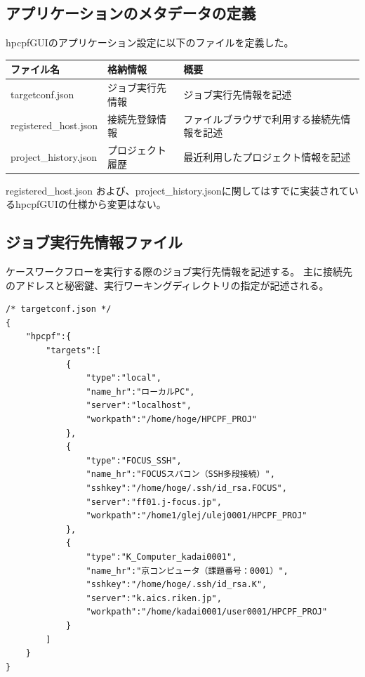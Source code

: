 \documentclass[a4paper,10pt,oneside]{jsbook}
\begin{document}
\subsection{アプリケーションのメタデータの定義}

hpcpfGUIのアプリケーション設定に以下のファイルを定義した。

\begin{table}[htb]
	\begin{tabular}{|l|l|l|} \hline
		ファイル名 & 格納情報 & 概要 \\\hline\hline
		targetconf.json & ジョブ実行先情報 &ジョブ実行先情報を記述 \\\hline
		registered\_host.json & 接続先登録情報 & ファイルブラウザで利用する接続先情報を記述 \\\hline
		project\_history.json & プロジェクト履歴 & 最近利用したプロジェクト情報を記述 \\\hline
	\end{tabular}
\end{table}

registered\_host.json および、project\_history.jsonに関してはすでに実装されているhpcpfGUIの仕様から変更はない。

\subsection {ジョブ実行先情報ファイル}
ケースワークフローを実行する際のジョブ実行先情報を記述する。
主に接続先のアドレスと秘密鍵、実行ワーキングディレクトリの指定が記述される。 

\begin{verbatim}
/* targetconf.json */
{
    "hpcpf":{
        "targets":[
            {
                "type":"local",
                "name_hr":"ローカルPC",
                "server":"localhost",
                "workpath":"/home/hoge/HPCPF_PROJ" 
            },
            {
                "type":"FOCUS_SSH",
                "name_hr":"FOCUSスパコン（SSH多段接続）",
                "sshkey":"/home/hoge/.ssh/id_rsa.FOCUS",
                "server":"ff01.j-focus.jp",
                "workpath":"/home1/glej/ulej0001/HPCPF_PROJ" 
            },
            {
                "type":"K_Computer_kadai0001",
                "name_hr":"京コンピュータ（課題番号：0001）",
                "sshkey":"/home/hoge/.ssh/id_rsa.K",
                "server":"k.aics.riken.jp",
                "workpath":"/home/kadai0001/user0001/HPCPF_PROJ" 
            }
        ]        
    }
}
\end{verbatim}
\end{document}
